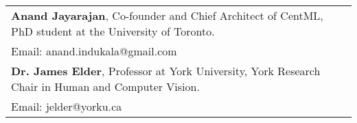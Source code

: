 \begin{tabularx}{\textwidth}{ @{}l r@{} }
    \textbf{Anand Jayarajan}, Co-founder and Chief Architect of CentML,   PhD student at the University of Toronto. \\
    Email: anand.indukala@gmail.com \\[10pt]
    \textbf{Dr. James Elder}, Professor at York University,   York Research Chair in Human and Computer Vision. \\
    Email: jelder@yorku.ca 
\end{tabularx}
\\[5pt]